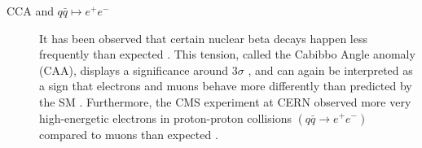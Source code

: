 \begin{description}
	\item[CCA and $q\bar q \mapsto e^+ e^-$] It has been observed that certain nuclear beta decays happen less frequently than expected \cite{PhysRevC.102.045501}. This tension, called the Cabibbo Angle anomaly (CAA), displays a significance around $3 \sigma$ \cite{1674-1137-40-10-100001}, and can again be interpreted as a sign that electrons and muons behave more differently than predicted by the SM \cite{PhysRevLett.125.111801}. Furthermore, the CMS experiment at CERN observed more very high-energetic electrons in proton-proton collisions $\left(q \bar{q} \rightarrow e^{+} e^{-}\right)$ compared to muons than expected \cite{Sirunyan2021}.
\end{description}
